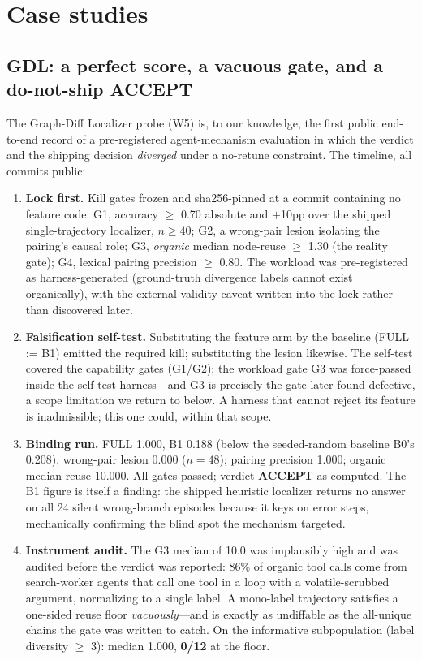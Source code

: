 \documentclass[11pt]{article}
\begin{document}
\section{Case studies}

\subsection{GDL: a perfect score, a vacuous gate, and a do-not-ship ACCEPT}
\label{sec:gdl}

The Graph-Diff Localizer probe (W5) is, to our knowledge, the first public end-to-end record of a pre-registered agent-mechanism evaluation in which the verdict and the shipping decision \emph{diverged} under a no-retune constraint. The timeline, all commits public:

\begin{enumerate}
  \item \textbf{Lock first.} Kill gates frozen and sha256-pinned at a commit containing no feature code: G1, accuracy $\geq$ 0.70 absolute and $+$10pp over the shipped single-trajectory localizer, $n \geq 40$; G2, a wrong-pair lesion isolating the pairing's causal role; G3, \emph{organic} median node-reuse $\geq$ 1.30 (the reality gate); G4, lexical pairing precision $\geq$ 0.80. The workload was pre-registered as harness-generated (ground-truth divergence labels cannot exist organically), with the external-validity caveat written into the lock rather than discovered later.
  \item \textbf{Falsification self-test.} Substituting the feature arm by the baseline (FULL := B1) emitted the required kill; substituting the lesion likewise. The self-test covered the capability gates (G1/G2); the workload gate G3 was force-passed inside the self-test harness---and G3 is precisely the gate later found defective, a scope limitation we return to below. A harness that cannot reject its feature is inadmissible; this one could, within that scope.
  \item \textbf{Binding run.} FULL 1.000, B1 0.188 (below the seeded-random baseline B0's 0.208), wrong-pair lesion 0.000 ($n{=}48$); pairing precision 1.000; organic median reuse 10.000. All gates passed; verdict \textbf{ACCEPT} as computed. The B1 figure is itself a finding: the shipped heuristic localizer returns no answer on all 24 silent wrong-branch episodes because it keys on error steps, mechanically confirming the blind spot the mechanism targeted.
  \item \textbf{Instrument audit.} The G3 median of 10.0 was implausibly high and was audited before the verdict was reported: 86\% of organic tool calls come from search-worker agents that call one tool in a loop with a volatile-scrubbed argument, normalizing to a single label. A mono-label trajectory satisfies a one-sided reuse floor \emph{vacuously}---and is exactly as undiffable as the all-unique chains the gate was written to catch. On the informative subpopulation (label diversity $\geq$ 3): median 1.000, \textbf{0/12} at the floor.

\end{enumerate}
\end{document}
